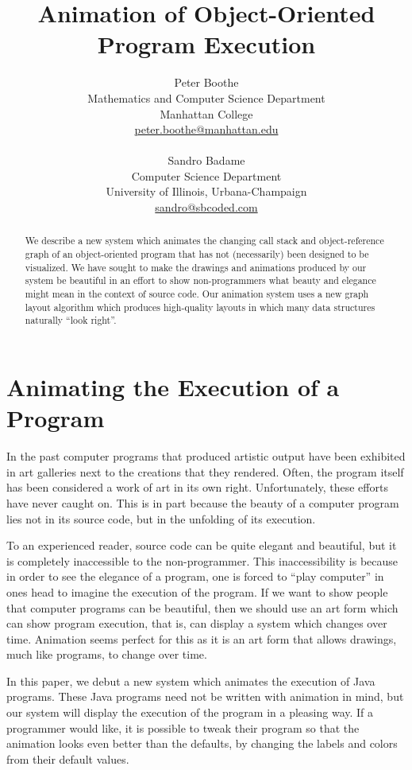 \documentclass[11pt]{article}
\title{\textbf{Animation of Object-Oriented Program Execution}}
\author{
 	Peter Boothe\\
	Mathematics and Computer Science Department \\
	Manhattan College \\
	\url{peter.boothe@manhattan.edu}\\
        \\
 	Sandro Badame \\
	Computer Science Department \\
	University of Illinois, Urbana-Champaign \\
	\url{sandro@sbcoded.com}
}
\date{}
\begin{document}
\maketitle

\thispagestyle{empty}

\begin{abstract}

We describe a new system which animates the changing call stack and
object-reference graph of an object-oriented program that has not (necessarily)
been designed to be visualized.  We have sought to make the drawings and
animations produced by our system be beautiful in an effort to show
non-programmers what beauty and elegance might mean in the context of source
code.  Our animation system uses a new graph layout algorithm which produces
high-quality layouts in which many data structures naturally ``look right''.

\end{abstract}

\section{Animating the Execution of a Program}

In the past computer programs that produced artistic output have been exhibited
in art galleries next to the creations that they rendered. Often, the
program itself has been considered a work of art in its own right.
 Unfortunately, these efforts have never caught on.  This is in part
because the beauty of a computer program lies not in its source code, but in
the unfolding of its execution.

To an experienced reader, source code can be quite elegant and beautiful, but
it is completely inaccessible to the non-programmer.  This inaccessibility is
because in order to see the elegance of a program, one is forced to ``play
computer'' in ones head to imagine the execution of the program.  If we want to
show people that computer programs can be beautiful, then we should use an art
form which can show program execution, that is, can display a system which
changes over time. Animation seems perfect for this as it is an art form that
allows drawings, much like programs, to change over time.

In this paper, we debut a new system which animates the execution of Java
programs.  These Java programs need not be written with animation in mind, but
our system will display the execution of the program in a pleasing way.  If a
programmer would like, it is possible to tweak their program so that the
animation looks even better than the defaults, by changing the labels and
colors from their default values.
\end{document}
